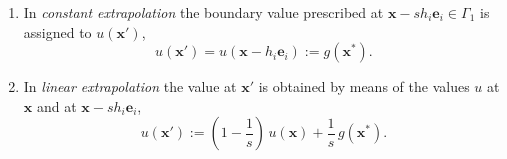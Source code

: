 \begin{enumerate}
\item In \emph{constant extrapolation} the boundary value prescribed at
  $\mathbf{x} - s h_i\mathbf{e}_i \in \Gamma_1$ is assigned to
  $u(\mathbf{x}')$,
  \begin{equation}
    \label{eq:const_extrapol}
    u(\mathbf{x}') = u(\mathbf{x} - h_i\mathbf{e}_i) := g(\mathbf{x}^*).
  \end{equation}
\item In \emph{linear extrapolation} the value at $\mathbf{x}'$ is
  obtained by means of the values $u$ at $\mathbf{x}$ and at $\mathbf{x}
  - sh_i\mathbf{e}_i$,
  \begin{equation}
    \label{eq:lin_extrapol}
    u(\mathbf{x}') := (1-\frac{1}{s})\, u(\mathbf{x}) + \frac{1}{s}\,
    g(\mathbf{x}^*).
  \end{equation}


\end{enumerate}
